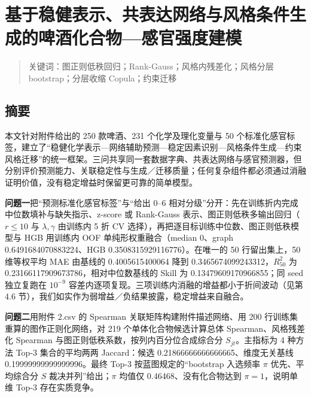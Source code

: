\documentclass[
  11pt,
]{article}
\author{}
\date{}
\begin{document}
{
\setcounter{tocdepth}{2}
\tableofcontents
}
\section{基于稳健表示、共表达网络与风格条件生成的啤酒化合物---感官强度建模}\label{ux57faux4e8eux7a33ux5065ux8868ux793aux5171ux8868ux8fbeux7f51ux7edcux4e0eux98ceux683cux6761ux4ef6ux751fux6210ux7684ux5564ux9152ux5316ux5408ux7269ux611fux5b98ux5f3aux5ea6ux5efaux6a21}

\begin{quote}
关键词：图正则低秩回归；Rank-Gauss；风格内残差化；风格分层
bootstrap；分层收缩 Copula；约束迁移
\end{quote}

\subsection{摘要}\label{ux6458ux8981}

本文针对附件给出的 250 款啤酒、231 个化学及理化变量与 50
个标准化感官标签，建立了``稳健化学表示---网络辅助预测---稳定因素识别---风格条件生成---约束风格迁移''的统一框架。三问共享同一套数据字典、共表达网络与感官预测器，但分别评价预测能力、关联稳定性与生成／迁移质量；任何复杂组件都必须通过消融证明价值，没有稳定增益时保留更可靠的简单模型。

\textbf{问题一}把``预测标准化感官标签''与``给出 0--6
相对分级''分开：先在训练折内完成中位数填补与缺失指示、z-score 或
Rank-Gauss 表示、图正则低秩多输出回归（\(r\le 10\) 与 \(\lambda,\gamma\)
由训练内 5 折 CV 选择），再把逐目标训练中位数、图正则低秩模型与 HGB
用训练内 OOF 单纯形权重融合（median 0、graph 0.6491684070883224、HGB
0.3508315929116776）。在唯一的 50 行留出集上，50 维等权平均 MAE 由基线的
0.4005615400064 降到 0.3465674099243312，\(R^2_{50}\) 为
0.23166117909673786，相对中位数基线的 Skill 为 0.13479609170966855；同
seed 独立复跑在 \(10^{-9}\)
容差内逐项复现。三项训练内消融的增益都小于折间波动（见第 4.6
节），我们如实作为弱增益／负结果披露，稳定增益来自融合。

\textbf{问题二}用附件 2.csv 的 Spearman 关联矩阵构建附件描述网络、用 200
行训练集重算的图作正则化网络，对 219 个单体化合物候选计算总体
Spearman、风格残差化 Spearman 与图正则低秩系数，按列内百分位合成综合分
\(S_{jt}\)。主指标为 4 种方法 Top-3 集合的平均两两 Jaccard：候选
0.21866666666666665、维度无关基线 0.19999999999999996。最终 Top-3
按蓝图规定的``bootstrap 入选频率 \(\pi\) 优先、平均综合分 \(S\)
裁决并列''给出；\(\pi\) 均值仅 0.46468、没有化合物达到
\(\pi=1\)，说明单维 Top-3 存在实质竞争。
\end{document}
